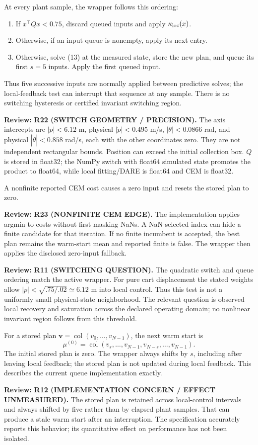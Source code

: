 \documentclass[11pt]{article}
\newcommand{\col}{\operatorname{col}}
\newcommand{\review}[1]{\par\noindent\textcolor{red!70!black}{\textbf{Review:} #1}\par}
\begin{document}
At every plant sample, the wrapper follows this ordering:
\begin{enumerate}
\item If $x^\top Qx<0.75$, discard queued inputs and apply $\kappa_{\rm loc}(x)$.
\item Otherwise, if an input queue is nonempty, apply its next entry.
\item Otherwise, solve (13) at the measured state, store the new plan, and queue its first $s=5$ inputs. Apply the first queued input.
\end{enumerate}
Thus five successive inputs are normally applied between predictive solves; the local-feedback test can interrupt that sequence at any sample. There is no switching hysteresis or certified invariant switching region.
\review{\textbf{R22 (SWITCH GEOMETRY / PRECISION).} The axis intercepts are $|p|<6.12$ m, physical $|\dot p|<0.495$ m/s, $|\theta|<0.0866$ rad, and physical $|\dot\theta|<0.858$ rad/s, each with the other coordinates zero. They are not independent rectangular bounds. Position can exceed the initial collection box. $Q$ is stored in float32; the NumPy switch with float64 simulated state promotes the product to float64, while local fitting/DARE is float64 and CEM is float32.}
 A nonfinite reported CEM cost causes a zero input and resets the stored plan to zero.
\review{\textbf{R23 (NONFINITE CEM EDGE).} The implementation applies argmin to costs without first masking NaNs. A NaN-selected index can hide a finite candidate for that iteration. If no finite incumbent is accepted, the best plan remains the warm-start mean and reported finite is false. The wrapper then applies the disclosed zero-input fallback.}

\review{\textbf{R11 (SWITCHING QUESTION).} The quadratic switch and queue ordering match the active wrapper. For pure cart displacement the stated weights allow $|p|<\sqrt{.75/.02}\simeq6.12$ m into local control. Thus this test is not a uniformly small physical-state neighborhood. The relevant question is observed local recovery and saturation across the declared operating domain; no nonlinear invariant region follows from this threshold.}


For a stored plan $\mathbf v=\col(v_0,\ldots,v_{N-1})$, the next warm start is
\begin{equation}\label{eq:warmstart}
\mu^{(0)}=\col(v_s,\ldots,v_{N-1},v_{N-s},\ldots,v_{N-1}).
\end{equation}
The initial stored plan is zero. The wrapper always shifts by $s$, including after leaving local feedback; the stored plan is not updated during local feedback. This describes the current queue implementation exactly.
\review{\textbf{R12 (IMPLEMENTATION CONCERN / EFFECT UNMEASURED).} The stored plan is retained across local-control intervals and always shifted by five rather than by elapsed plant samples. That can produce a stale warm start after an interruption. The specification accurately reports this behavior; its quantitative effect on performance has not been isolated.}
\end{document}
